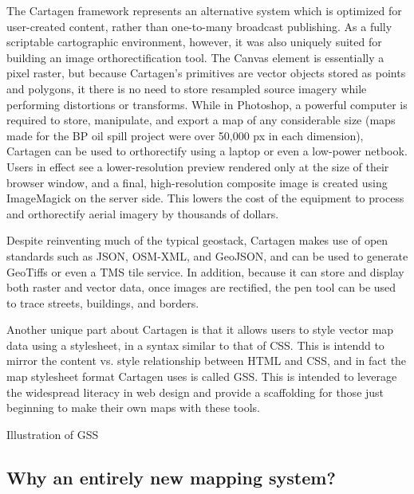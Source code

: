 \documentclass[11pt]{report}
\begin{document}
The Cartagen framework represents an alternative system which is optimized for user-created content, rather than one-to-many broadcast publishing. As a fully scriptable cartographic environment, however, it was also uniquely suited for building an image orthorectification tool. The Canvas element is essentially a pixel raster, but because Cartagen's primitives are vector objects stored as points and polygons, it there is no need to store resampled source imagery while performing distortions or transforms. While in Photoshop, a powerful computer is required to store, manipulate, and export a map of any considerable size (maps made for the BP oil spill project were over 50,000 px in each dimension), Cartagen can be used to orthorectify using a laptop or even a low-power netbook. Users in effect see a lower-resolution preview rendered only at the size of their browser window, and a final, high-resolution composite image is created using ImageMagick on the server side. This lowers the cost of the equipment to process and orthorectify aerial imagery by thousands of dollars. 



Despite reinventing much of the typical geostack, Cartagen makes use of open standards such as JSON, OSM-XML, and GeoJSON, and can be used to generate GeoTiffs or even a TMS tile service. In addition, because it can store and display both raster and vector data, once images are rectified, the pen tool can be used to trace streets, buildings, and borders.   

Another unique part about Cartagen is that it allows users to style vector map data using a stylesheet, in a syntax similar to that of CSS. This is intendd to mirror the content vs. style relationship between HTML and CSS, and in fact the map stylesheet format Cartagen uses is called GSS. This is intended to leverage the widespread literacy in web design and provide a scaffolding for those just beginning to make their own maps with these tools. 

Illustration of GSS

\subsection{Why an entirely new mapping system?}
\end{document}
